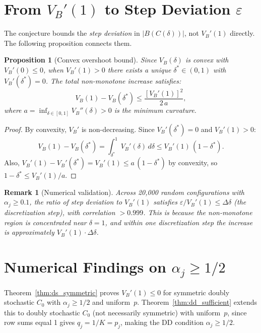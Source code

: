 \documentclass[11pt]{article}
\newtheorem{proposition}[theorem]{Proposition}
\newtheorem{remark}[theorem]{Remark}
\begin{document}
\section{From $V_B'(1)$ to Step Deviation $\varepsilon$}

The conjecture bounds the \emph{step deviation} in $|B(C(\delta))|$, not $V_B'(1)$ directly.
The following proposition connects them.

\begin{proposition}[Convex overshoot bound]
\label{prop:overshoot}
Since $V_B(\delta)$ is convex with $V_B'(0) \leq 0$, when $V_B'(1) > 0$ there exists
a unique $\delta^* \in (0,1)$ with $V_B'(\delta^*) = 0$.
The total non-monotone increase satisfies:
\begin{equation}
  V_B(1) - V_B(\delta^*) \leq \frac{[V_B'(1)]^2}{2\,a},
  \label{eq:overshoot}
\end{equation}
where $a = \inf_{\delta \in [0,1]} V_B''(\delta) > 0$ is the minimum curvature.
\end{proposition}

\begin{proof}
By convexity, $V_B'$ is non-decreasing.
Since $V_B'(\delta^*) = 0$ and $V_B'(1) > 0$:
\[
  V_B(1) - V_B(\delta^*) = \int_{\delta^*}^1 V_B'(\delta)\,d\delta
  \leq V_B'(1)\,(1-\delta^*).
\]
Also, $V_B'(1) - V_B'(\delta^*) = V_B'(1) \leq a\,(1-\delta^*)$ by convexity, so $1-\delta^* \leq V_B'(1)/a$.
\end{proof}

\begin{remark}[Numerical validation]
Across 20{,}000 random configurations with $\alpha_j \geq 0.1$,
the ratio of step deviation to $V_B'(1)$ satisfies
$\varepsilon / V_B'(1) \leq \Delta\delta$ (the discretization step),
with correlation $> 0.999$.
This is because the non-monotone region is concentrated near $\delta = 1$,
and within one discretization step the increase is approximately $V_B'(1) \cdot \Delta\delta$.
\end{remark}

\section{Numerical Findings on $\alpha_j \geq 1/2$}

Theorem~\ref{thm:ds_symmetric} proves $V_B'(1) \leq 0$ for symmetric doubly stochastic $C_0$ with $\alpha_j \geq 1/2$ and uniform~$p$.
Theorem~\ref{thm:dd_sufficient} extends this to doubly stochastic $C_0$ (not necessarily symmetric) with uniform~$p$, since row sums equal 1 gives $q_j = 1/K = p_j$, making the DD condition $\alpha_j \geq 1/2$.
\end{document}
